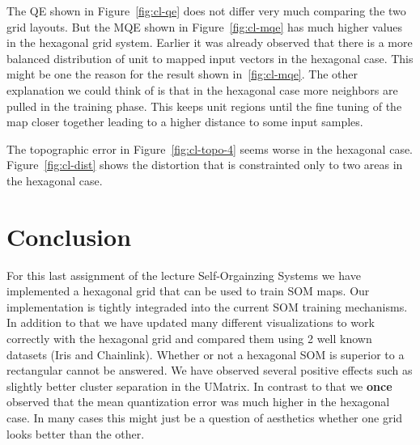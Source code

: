 \documentclass{acm_proc_article-sp}
\begin{document}
The QE shown in Figure~\ref{fig:cl-qe} does not differ very much comparing the two grid layouts.
But the MQE shown in Figure~\ref{fig:cl-mqe} has much higher values in the hexagonal grid system. Earlier it was already observed that there is a more balanced distribution of unit to mapped input vectors in the hexagonal case. This might be one the reason for the result shown in~\ref{fig:cl-mqe}. The other explanation we could think of is that in the hexagonal case more neighbors are pulled in the training phase. This keeps unit regions until the fine tuning of the map closer together leading to a higher distance to some input samples.


The topographic error in Figure~\ref{fig:cl-topo-4} seems worse in the hexagonal case. Figure~\ref{fig:cl-dist} shows the distortion that is constrainted only to two areas in the hexagonal case.

\section{Conclusion}

For this last assignment of the lecture Self-Orgainzing Systems we have implemented a hexagonal grid that can be used to train SOM maps. Our implementation is tightly integraded into the current SOM training mechanisms.
In addition to that we have updated many different visualizations to work correctly with the hexagonal grid and compared them using 2 well known datasets (Iris and Chainlink).
Whether or not a hexagonal SOM is superior to a rectangular cannot be answered. We have observed several positive effects such as slightly better cluster separation in the UMatrix. In contrast to that we \textbf{once} observed that the mean quantization error was much higher in the hexagonal case.
In many cases this might just be a question of aesthetics whether one grid looks better than the other.



\end{document}
